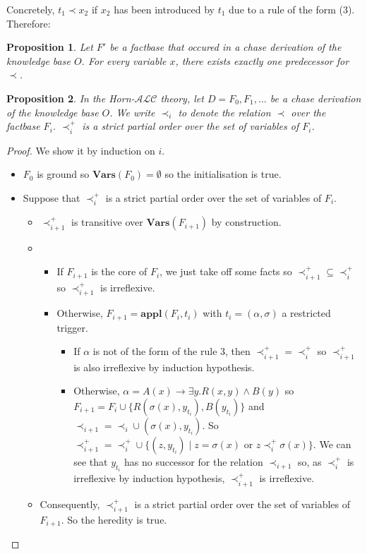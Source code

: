 \documentclass{article}
\newtheorem{proposition}{Proposition}[section]
\theoremstyle{definition}
\theoremstyle{remark}
\newcommand{\Vars}{\textbf{Vars}}
\newcommand{\Appl}{\textbf{appl}}
\begin{document}
Concretely, $t_1 \prec x_2$ if $x_2$ has been introduced by $t_1$ due to a rule of the form (3). Therefore:

\begin{proposition} \label{only one predecessor}
Let $F'$ be a factbase that occured in a chase derivation of the knowledge base $O$. For every variable $x$, there exists exactly one predecessor for $\prec$.
\end{proposition}


\begin{proposition} \label{partial_order}
In the Horn-$\mathcal{ALC}$ theory, let $D = F_0,F_1,\ldots$ be a chase derivation of the knowledge base $O$. We write $\prec_i$ to denote the relation $\prec$ over the factbase $F_i$. $\prec^+_i$ is a strict partial order over the set of variables of $F_i$.
\end{proposition}

\begin{proof}
We show it by induction on $i$.
\begin{itemize}
\item $F_0$ is ground so $\Vars(F_0) = \emptyset$ so the initialisation is true.
\item Suppose that $\prec^+_i$ is a strict partial order over the set of variables of $F_i$.
\begin{itemize}
\item $\prec^+_{i+1}$ is transitive over $\Vars(F_{i+1})$ by construction.
\item 
\begin{itemize}
\item If $F_{i+1}$ is the core of $F_i$, we just take off some facts so $\prec^+_{i+1} \subseteq \prec^+_{i}$  so $\prec^+_{i+1}$ is irreflexive.
\item Otherwise, $F_{i+1}= \Appl(F_{i},t_i)$ with $t_i = (\alpha,\sigma)$ a restricted trigger. 
\begin{itemize}
\item If $\alpha$ is not of the form of the rule $3$, then $\prec^+_{i+1} = \prec^+_{i}$  so $\prec^+_{i+1}$ is also irreflexive by induction hypothesis.
\item Otherwise, $\alpha = A(x) \rightarrow \exists y.R(x,y) \wedge B(y)$ so $F_{i+1} = F_i \cup \{R(\sigma(x),y_{t_i}),B(y_{t_i})\}$ and $\prec_{i+1} =\prec_i \cup (\sigma(x),y_{t_i})$. So $\prec^+_{i+1} = \prec^+_{i} \cup \{(z,y_{t_i}) \mid z = \sigma(x)$ or $z \prec_i^+ \sigma(x)\}$. We can see that $y_{t_i}$ has no successor for the relation $\prec_{i+1}$ so, as $\prec^+_i$ is irreflexive by induction hypothesis, $\prec^+_{i+1}$ is irreflexive.
\end{itemize}
\end{itemize}

\item Consequently, $\prec^+_{i+1}$ is a strict partial order over the set of variables of $F_{i+1}$. So the heredity is true.
\end{itemize}
\end{itemize}
\end{proof}
\end{document}
